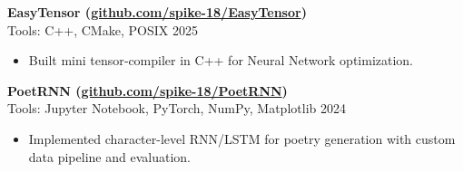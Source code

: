 \documentclass[12pt]{article}
\newcommand{\entry}[4]{{{\textbf{#1}}} \hfill #3 \\ #2 \hfill #4}
\begin{document}
\begin{paracol}{2}
		
		\entry{EasyTensor \normalfont \footnotesize{(\href{https://github.com/spike-18/EasyTensor}{github.com/spike-18/EasyTensor})}}{Tools: C++, CMake, POSIX}{ }{2025}
		\begin{itemize}[noitemsep,leftmargin=3.5mm,rightmargin=0mm,topsep=6pt]
			\item Built mini tensor‑compiler in C++ for Neural Network optimization.
		\end{itemize}
				
		\entry{PoetRNN \normalfont \footnotesize{(\href{https://github.com/spike-18/PoetRNN}{github.com/spike-18/PoetRNN})}}{Tools: Jupyter Notebook, PyTorch, NumPy, Matplotlib}{ }{2024}
		\begin{itemize}[noitemsep,leftmargin=3.5mm,rightmargin=0mm,topsep=6pt]
			\item  Implemented character-level RNN/LSTM for poetry generation with custom data pipeline and evaluation.
		\end{itemize}	
		
		\medskip

		
	\end{paracol}
	
\end{document}

